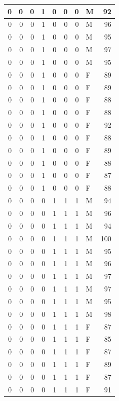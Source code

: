 \documentclass[
  12pt,
]{krantz}
\begin{document}
\begin{tabular}{r|r|r|r|r|r|r|l|r}
\hline
0 & 0 & 0 & 1 & 0 & 0 & 0 & M & 92\\
\hline
0 & 0 & 0 & 1 & 0 & 0 & 0 & M & 96\\
\hline
0 & 0 & 0 & 1 & 0 & 0 & 0 & M & 95\\
\hline
0 & 0 & 0 & 1 & 0 & 0 & 0 & M & 97\\
\hline
0 & 0 & 0 & 1 & 0 & 0 & 0 & M & 95\\
\hline
0 & 0 & 0 & 1 & 0 & 0 & 0 & F & 89\\
\hline
0 & 0 & 0 & 1 & 0 & 0 & 0 & F & 89\\
\hline
0 & 0 & 0 & 1 & 0 & 0 & 0 & F & 88\\
\hline
0 & 0 & 0 & 1 & 0 & 0 & 0 & F & 88\\
\hline
0 & 0 & 0 & 1 & 0 & 0 & 0 & F & 92\\
\hline
0 & 0 & 0 & 1 & 0 & 0 & 0 & F & 88\\
\hline
0 & 0 & 0 & 1 & 0 & 0 & 0 & F & 89\\
\hline
0 & 0 & 0 & 1 & 0 & 0 & 0 & F & 88\\
\hline
0 & 0 & 0 & 1 & 0 & 0 & 0 & F & 87\\
\hline
0 & 0 & 0 & 1 & 0 & 0 & 0 & F & 88\\
\hline
0 & 0 & 0 & 0 & 1 & 1 & 1 & M & 94\\
\hline
0 & 0 & 0 & 0 & 1 & 1 & 1 & M & 96\\
\hline
0 & 0 & 0 & 0 & 1 & 1 & 1 & M & 94\\
\hline
0 & 0 & 0 & 0 & 1 & 1 & 1 & M & 100\\
\hline
0 & 0 & 0 & 0 & 1 & 1 & 1 & M & 95\\
\hline
0 & 0 & 0 & 0 & 1 & 1 & 1 & M & 96\\
\hline
0 & 0 & 0 & 0 & 1 & 1 & 1 & M & 97\\
\hline
0 & 0 & 0 & 0 & 1 & 1 & 1 & M & 97\\
\hline
0 & 0 & 0 & 0 & 1 & 1 & 1 & M & 95\\
\hline
0 & 0 & 0 & 0 & 1 & 1 & 1 & M & 98\\
\hline
0 & 0 & 0 & 0 & 1 & 1 & 1 & F & 87\\
\hline
0 & 0 & 0 & 0 & 1 & 1 & 1 & F & 85\\
\hline
0 & 0 & 0 & 0 & 1 & 1 & 1 & F & 87\\
\hline
0 & 0 & 0 & 0 & 1 & 1 & 1 & F & 89\\
\hline
0 & 0 & 0 & 0 & 1 & 1 & 1 & F & 87\\
\hline
0 & 0 & 0 & 0 & 1 & 1 & 1 & F & 91\\

\end{tabular}
\end{document}
